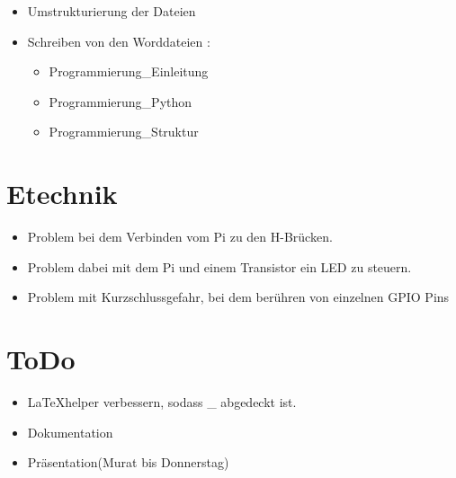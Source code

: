 \documentclass{article}
\begin{document}
\begin{itemize}

\item Umstrukturierung der Dateien

\item Schreiben von den Worddateien :
\begin{itemize}

\item Programmierung\_Einleitung

\item Programmierung\_Python

\item Programmierung\_Struktur

\end{itemize} 

\end{itemize}

\section{Etechnik}

\begin{itemize}

\item Problem bei dem Verbinden vom Pi zu den H-Brücken.

\item Problem dabei mit dem Pi und einem Transistor ein LED zu steuern.


\item Problem mit Kurzschlussgefahr, bei dem berühren von einzelnen GPIO Pins

\end{itemize}

\section{ToDo}

\begin{itemize}

\item \LaTeX helper verbessern, sodass \_ abgedeckt ist.

\item Dokumentation 

\item Pr\"{a}sentation(Murat bis Donnerstag)

\end{itemize}
\end{document}
